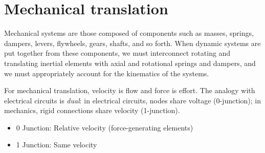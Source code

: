 \section{Mechanical translation}

Mechanical systems are those composed of components such as masses, springs, dampers, levers, flywheels, gears, shafts, and so forth. When dynamic systems are put together from these components, we must interconnect rotating and translating inertial elements with axial and rotational springs and dampers, and we must appropriately account for the kinematics of the systems.

For mechanical translation, velocity is flow and force is effort. The analogy with electrical circuits is \emph{dual}: in electrical circuits, nodes share voltage (0-junction); in mechanics, rigid connections share velocity (1-junction). 

\begin{itemize}
  \item 0 Junction: Relative velocity (force-generating elements)
  \item 1 Junction: Same velocity
\end{itemize}

